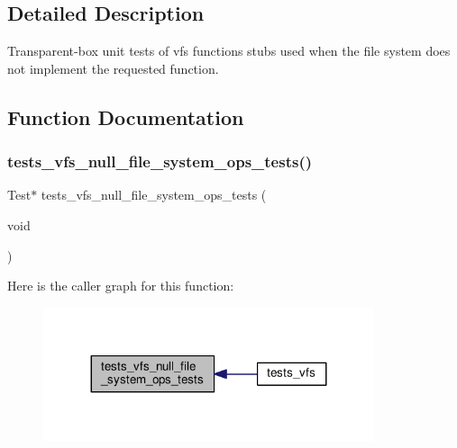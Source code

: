 \subsection{Detailed Description}
Transparent-\/box unit tests of vfs functions stubs used when the file system does not implement the requested function. 



\subsection{Function Documentation}
\mbox{\label{tests-vfs-file-system-ops_8c_af7fa3a64422e93a058748b6bd2516ae3}} 
\subsubsection{\texorpdfstring{tests\+\_\+vfs\+\_\+null\+\_\+file\+\_\+system\+\_\+ops\+\_\+tests()}{tests\_vfs\_null\_file\_system\_ops\_tests()}}
{\footnotesize\ttfamily Test$\ast$ tests\+\_\+vfs\+\_\+null\+\_\+file\+\_\+system\+\_\+ops\+\_\+tests (\begin{DoxyParamCaption}\item[{void}]{ }\end{DoxyParamCaption})}

Here is the caller graph for this function\+:
\nopagebreak
\begin{figure}[H]
\begin{center}
\leavevmode
\includegraphics[width=275pt]{tests-vfs-file-system-ops_8c_af7fa3a64422e93a058748b6bd2516ae3_icgraph}
\end{center}
\end{figure}
